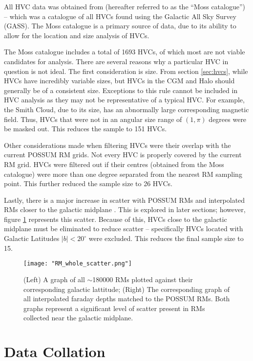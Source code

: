 All HVC data was obtained from \cite{ID3} (hereafter referred to as the “Moss catalogue”) – which was a catalogue of all HVCs found using the Galactic All Sky Survey (GASS). The Moss catalogue is a primary source of data, due to its ability to allow for the location and size analysis of HVCs.


The Moss catalogue includes a total of 1693 HVCs, of which most are not viable candidates for analysis. There are several reasons why a particular HVC in question is not ideal. The first consideration is size. From section \ref{sec:hvcs}, while HVCs have incredibly variable sizes, but HVCs in the CGM and Halo should generally be of a consistent size. Exceptions to this rule cannot be included in HVC analysis as they may not be representative of a typical HVC. For example, the Smith Cloud, due to its size, has an abnormally large corresponding magnetic field. Thus, HVCs that were not in an angular size range of $(1,\pi)$ degrees were be masked out. This reduces the sample to 151 HVCs.


Other considerations made when filtering HVCs were their overlap with the current POSSUM RM grids. Not every HVC is properly covered by the current RM grid. HVCs were filtered out if their centres (obtained from the Moss catalogue) were more than one degree separated from the nearest RM sampling point. This further reduced the sample size to 26 HVCs.


Lastly, there is a major increase in scatter with POSSUM RMs and interpolated RMs closer to the galactic midplane \citep{ID21}. This is explored in later sections; however, figure \ref{fig:rm_scatter} represents this scatter. Because of this, HVCs close to the galactic midplane must be eliminated to reduce scatter – specifically HVCs located with Galactic Latitudes $|b|<20^{\circ}$ were excluded. This reduces the final sample size to 15.

\begin{figure}
    \texttt{[image: "RM\_whole\_scatter.png"]}
    \centering
    \caption{(Left) A graph of all $\sim$180000 RMs plotted against their corresponding galactic lattitude; (Right) The corresponding graph of all interpolated faraday depths matched to the POSSUM RMs. Both graphs represent a significant level of scatter present in RMs collected near the galactic midplane.}
    \label{fig:rm_scatter}
\end{figure}

\section{Data Collation}
\label{sec:collation}

